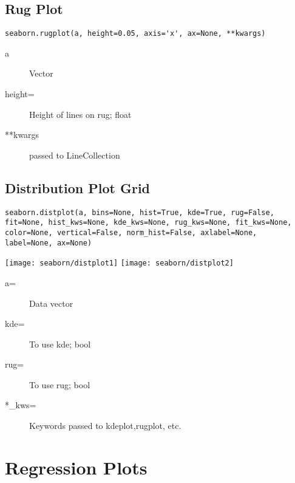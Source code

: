 \subsection{Rug Plot}
\begin{verbatim}
seaborn.rugplot(a, height=0.05, axis='x', ax=None, **kwargs)
\end{verbatim}
\begin{description}
	\item[a] Vector
	\item[height=] Height of lines on rug; float
	\item[**kwargs] passed to LineCollection
\end{description}

\subsection{Distribution Plot Grid}
\begin{verbatim}
seaborn.distplot(a, bins=None, hist=True, kde=True, rug=False, 
fit=None, hist_kws=None, kde_kws=None, rug_kws=None, fit_kws=None, 
color=None, vertical=False, norm_hist=False, axlabel=None, 
label=None, ax=None)
\end{verbatim}
\texttt{[image: seaborn/distplot1]}
\texttt{[image: seaborn/distplot2]}
\begin{description}
	\item[a=] Data vector
	\item[kde=] To use kde; bool
	\item[rug=] To use rug; bool
	\item[*\_kws=] Keywords passed to kdeplot,rugplot, etc.
\end{description}

\section{Regression Plots}

